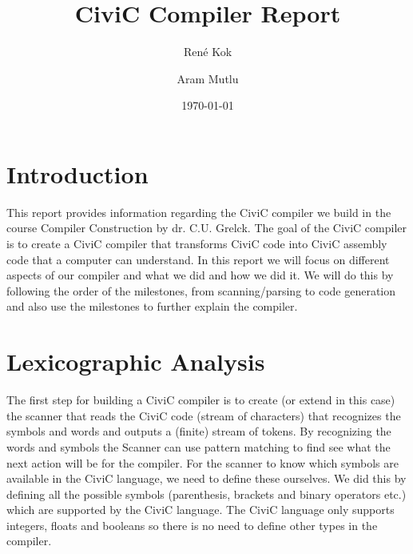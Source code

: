 \documentclass{uva-inf-article}
\title{CiviC Compiler Report}
\author{René Kok}
\author{Aram Mutlu}
\date{\today}
\begin{document}
\maketitle




\section{Introduction}
\par This report provides information regarding the CiviC compiler we build in 
the course Compiler Construction by dr. C.U. Grelck. The goal of the CiviC compiler 
is to create a CiviC compiler that transforms CiviC code into CiviC assembly code 
that a computer can understand. In this report we will focus on different aspects 
of our compiler and what we did and how we did it. We will do this by following the order of the milestones,
from scanning/parsing to code generation and also use the milestones to further 
explain the compiler.


\newpage
\section{Lexicographic Analysis}
The first step for building a CiviC compiler is to create (or extend in this case) 
the scanner that reads the CiviC code (stream of characters) that recognizes the 
symbols and words and outputs a (finite) stream of tokens.
By recognizing the words and symbols the Scanner can use pattern matching to find see
what the next action will be for the compiler. For the scanner to know which symbols
are available in the CiviC language, we need to define these ourselves. We did this 
by defining all the possible symbols (parenthesis, brackets and binary operators etc.)
which are supported by the CiviC language. The CiviC language only supports integers,
floats and booleans so there is no need to define other types in the compiler.
\end{document}

